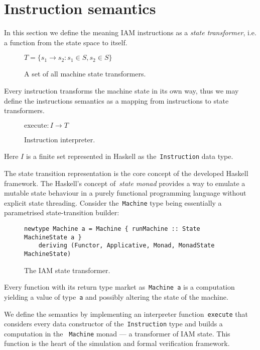 \section{Instruction semantics}

In this section we define the meaning IAM instructions as a \emph{state
transformer}, i.e. a function from the state space to itself.

\begin{figure}[H]
\centering
$T = \{s_1 \rightarrow s_2 : s_1 \in S, s_2 \in S\}$
\label{}
\caption{A set of all machine state transformers.}
\end{figure}

Every instruction transforms the machine state in its own
way, thus we may define the instructions semantics as a mapping from instructions
to state transformers.

\begin{figure}[H]
\centering
$ \textrm{execute}:I \rightarrow T$
\label{}
\caption{Instruction interpreter.}
\end{figure}

Here $I$ is a finite set represented in Haskell as
the~\texttt{Instruction} data type.

The state transition representation is the core concept of the developed
Haskell framework. The Haskell's concept of~\emph{state monad} provides a way to
emulate a mutable state behaviour in a purely functional programming language
without explicit state threading. Consider the~\texttt{Machine} type being
essentially a parametrised state-transition builder:

\begin{figure}[H]
\begin{verbatim}
newtype Machine a = Machine { runMachine :: State MachineState a }
    deriving (Functor, Applicative, Monad, MonadState MachineState)
\end{verbatim}
\caption{The IAM state transformer.}
\end{figure}

Every function with its return type market as~\texttt{Machine a} is a computation
yielding a value of type~\texttt{a} and possibly altering the state of the machine.

We define the semantics by implementing an interpreter
function~\texttt{execute} that considers every data constructor of
the~\texttt{Instruction} type and builds a computation in the
~\texttt{Machine} monad --- a transformer of IAM state. This function
is the heart of the simulation and formal verification framework.

